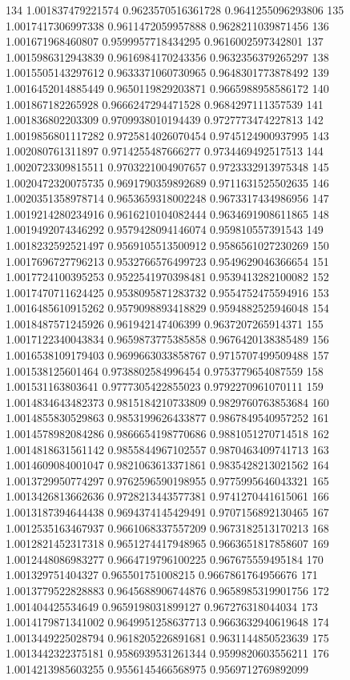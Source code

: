 134	1.001837479221574	0.9623570516361728	0.9641255096293806
135	1.0017417306997338	0.9611472059957888	0.9628211039871456
136	1.001671968460807	0.9599957718434295	0.9616002597342801
137	1.0015986312943839	0.9616984170243356	0.9632356379265297
138	1.0015505143297612	0.9633371060730965	0.9648301773878492
139	1.0016452014885449	0.9650119829203871	0.9665988958586172
140	1.001867182265928	0.9666247294471528	0.9684297111357539
141	1.001836802203309	0.9709938010194439	0.9727773474227813
142	1.0019856801117282	0.9725814026070454	0.9745124900937995
143	1.002080761311897	0.9714255487666277	0.9734469492517513
144	1.0020723309815511	0.9703221004907657	0.9723332913975348
145	1.0020472320075735	0.9691790359892689	0.9711631525502635
146	1.0020351358978714	0.9653659318002248	0.9673317434986956
147	1.0019214280234916	0.9616210104082444	0.9634691908611865
148	1.0019492074346292	0.9579428094146074	0.959810557391543
149	1.0018232592521497	0.9569105513500912	0.9586561027230269
150	1.0017696727796213	0.9532766576499723	0.9549629046366654
151	1.0017724100395253	0.9522541970398481	0.9539413282100082
152	1.0017470711624425	0.9538095871283732	0.9554752475594916
153	1.0016485610915262	0.9579098893418829	0.9594882525946048
154	1.0018487571245926	0.961942147406399	0.9637207265914371
155	1.0017122340043834	0.9659873775385858	0.9676420138385489
156	1.0016538109179403	0.9699663033858767	0.9715707499509488
157	1.001538125601464	0.9738802584996454	0.9753779654087559
158	1.001531163803641	0.9777305422855023	0.9792270961070111
159	1.0014834643482373	0.9815184210733809	0.9829760763853684
160	1.0014855830529863	0.9853199626433877	0.9867849540957252
161	1.0014578982084286	0.9866654198770686	0.9881051270714518
162	1.0014818631561142	0.9855844967102557	0.9870463409741713
163	1.0014609084001047	0.9821063613371861	0.9835428213021562
164	1.0013729950774297	0.9762596590198955	0.9775995646043321
165	1.0013426813662636	0.9728213443577381	0.9741270441615061
166	1.0013187394644438	0.9694374145429491	0.9707156892130465
167	1.0012535163467937	0.9661068337557209	0.9673182513170213
168	1.0012821452317318	0.9651274417948965	0.9663651817858607
169	1.0012448086983277	0.9664719796100225	0.967675559495184
170	1.001329751404327	0.965501751008215	0.9667861764956676
171	1.0013779522828883	0.9645688906744876	0.9658985319901756
172	1.001404425534649	0.9659198031899127	0.967276318044034
173	1.0014179871341002	0.9649951258637713	0.9663632940619648
174	1.0013449225028794	0.9618205226891681	0.9631144850523639
175	1.0013442322375181	0.9586939531261344	0.9599820603556211
176	1.0014213985603255	0.9556145466568975	0.9569712769892099
